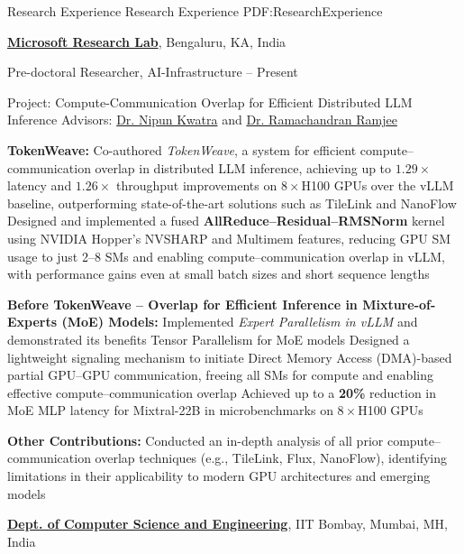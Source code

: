 \Section
{Research Experience}
{Research Experience}
{PDF:ResearchExperience}

\Entry
\href{https://www.microsoft.com/en-us/research/lab/microsoft-research-india/}
{\textbf{Microsoft Research Lab}},
Bengaluru, KA, India

\Gap
\BulletItem
Pre-doctoral Researcher, AI-Infrastructure
\hfill
{} --
Present
\begin{Detail}
\SubBulletItem
Project:
Compute-Communication Overlap for Efficient Distributed LLM Inference
\SubBulletItem
Advisors: \href{https://www.microsoft.com/en-us/research/people/nkwatra/}{Dr. Nipun Kwatra} and \href{https://www.microsoft.com/en-us/research/people/ramjee/}{Dr. Ramachandran Ramjee}

\Gap
\SubBulletItem
\textbf{TokenWeave:}
\SubSubBulletItem
Co-authored \textit{TokenWeave}, a system for efficient compute–communication overlap in distributed LLM inference, achieving up to {\bf $1.29\times$} latency and {\bf $1.26\times$} throughput improvements on $8\times$H100 GPUs over the vLLM baseline, outperforming state-of-the-art solutions such as TileLink and NanoFlow
\SubSubBulletItem
Designed and implemented a fused {\bf AllReduce--Residual--RMSNorm} kernel using NVIDIA Hopper’s NVSHARP and Multimem features, reducing GPU SM usage to just 2–8 SMs and enabling compute–communication overlap in vLLM, with performance gains even at small batch sizes and short sequence lengths

\Gap
\SubBulletItem
\textbf{Before TokenWeave – Overlap for Efficient Inference in Mixture-of-Experts (MoE) Models:}
\SubSubBulletItem
Implemented {\it Expert Parallelism in vLLM} and demonstrated its benefits Tensor Parallelism for MoE models
\SubSubBulletItem
Designed a lightweight signaling mechanism to initiate Direct Memory Access (DMA)-based partial GPU–GPU communication, freeing all SMs for compute and enabling effective compute–communication overlap
\SubSubBulletItem
Achieved up to a {\bf 20\%} reduction in MoE MLP latency for Mixtral-22B in microbenchmarks on $8\times$H100 GPUs

\Gap
\SubBulletItem
\textbf{Other Contributions:}
\SubSubBulletItem
Conducted an in-depth analysis of all prior compute–communication overlap techniques (e.g., TileLink, Flux, NanoFlow), identifying limitations in their applicability to modern GPU architectures and emerging models
\end{Detail}

\BigGap
\Entry
\href{https://www.cse.iitb.ac.in/synerg/}
{\textbf{Dept. of Computer Science and Engineering}},
IIT Bombay, Mumbai, MH, India

